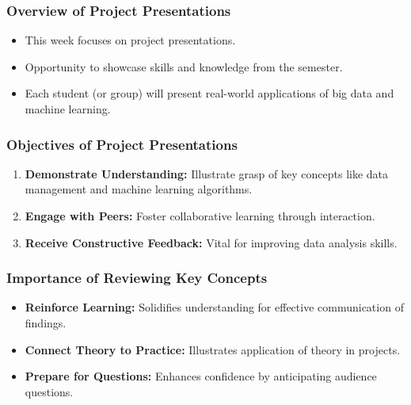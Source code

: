 \documentclass[aspectratio=169]{beamer}
\begin{document}
\frame{\titlepage}

\begin{frame}[fragile]
    \maketitle
\end{frame}

\begin{frame}[fragile]
    \frametitle{Overview of Project Presentations}
    \begin{itemize}
        \item This week focuses on project presentations.
        \item Opportunity to showcase skills and knowledge from the semester.
        \item Each student (or group) will present real-world applications of big data and machine learning.
    \end{itemize}
\end{frame}

\begin{frame}[fragile]
    \frametitle{Objectives of Project Presentations}
    \begin{enumerate}
        \item \textbf{Demonstrate Understanding:} Illustrate grasp of key concepts like data management and machine learning algorithms.
        \item \textbf{Engage with Peers:} Foster collaborative learning through interaction.
        \item \textbf{Receive Constructive Feedback:} Vital for improving data analysis skills.
    \end{enumerate}
\end{frame}

\begin{frame}[fragile]
    \frametitle{Importance of Reviewing Key Concepts}
    \begin{itemize}
        \item \textbf{Reinforce Learning:} Solidifies understanding for effective communication of findings.
        \item \textbf{Connect Theory to Practice:} Illustrates application of theory in projects.
        \item \textbf{Prepare for Questions:} Enhances confidence by anticipating audience questions.
    \end{itemize}
\end{frame}
\end{document}
